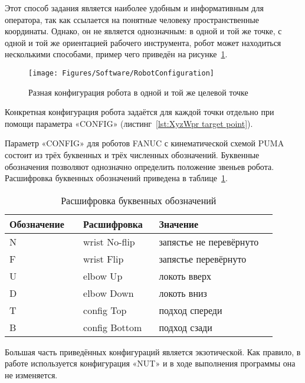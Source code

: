 Этот способ задания является наиболее удобным и информативным для оператора, так как ссылается на понятные человеку пространственные координаты.
Однако, он не является однозначным: в одной и той же точке, с одной и той же ориентацией рабочего инструмента, робот может находиться несколькими способами, пример чего приведён на рисунке~\ref{fig:Robot Configuration}.

\begin{figure}[H]
    \centering
    \vspace{14pt}
    \texttt{[image: Figures/Software/RobotConfiguration]}
    \caption{Разная конфигурация робота в одной и той же целевой точке}
    \label{fig:Robot Configuration}
\end{figure}

Конкретная конфигурация робота задаётся для каждой точки отдельно при помощи параметра «CONFIG» (листинг~\ref{lst:XyzWpr target point}).

Параметр «CONFIG» для роботов FANUC с кинематической схемой PUMA состоит из трёх буквенных и трёх численных обозначений.
Буквенные обозначения позволяют однозначно определить положение звеньев робота.
Расшифровка буквенных обозначений приведена в таблице~\ref{tab:Robot Config}.

\begin{longtable}[H]{|p{0.25\linewidth}|p{0.25\linewidth}|p{0.4\linewidth}|}
    \caption{Расшифровка буквенных обозначений}
    \label{tab:Robot Config} \\
    \hline
    Обозначение & Расшифровка   & Значение                \\ \hline
    N           & wrist No-flip & запястье не перевёрнуто \\ \hline
    F           & wrist Flip    & запястье перевёрнуто    \\ \hline
    U           & elbow Up      & локоть вверх            \\ \hline
    D           & elbow Down    & локоть вниз             \\ \hline
    T           & config Top    & подход спереди          \\ \hline
    B           & config Bottom & подход сзади            \\ \hline
\end{longtable}

Большая часть приведённых конфигураций является экзотической.
Как правило, в работе используется конфигурация «NUT» и в ходе выполнения программы она не изменяется.

